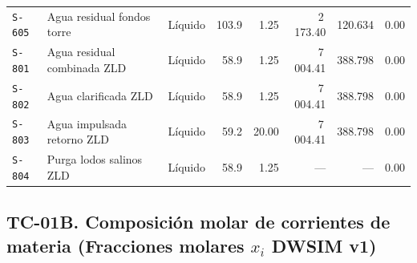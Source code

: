 \documentclass[11pt,letterpaper]{article}
\begin{document}
\begin{landscape}
\begin{center}
\begin{tabularx}{\textwidth}{lXcrrrrc}
\texttt{S-605} & Agua residual fondos torre & Líquido & 103.9 & 1.25 & 2\,173.40 & 120.634 & 0.00 \\
\texttt{S-801} & Agua residual combinada ZLD & Líquido & 58.9 & 1.25 & 7\,004.41 & 388.798 & 0.00 \\
\texttt{S-802} & Agua clarificada ZLD & Líquido & 58.9 & 1.25 & 7\,004.41 & 388.798 & 0.00 \\
\texttt{S-803} & Agua impulsada retorno ZLD & Líquido & 59.2 & 20.00 & 7\,004.41 & 388.798 & 0.00 \\
\texttt{S-804} & Purga lodos salinos ZLD & Líquido & 58.9 & 1.25 & --- & --- & 0.00 \\
\bottomrule
\end{tabularx}
\end{center}

\clearpage

\subsection{TC-01B. Composición molar de corrientes de materia (Fracciones molares $x_i$ DWSIM v1)}


\end{landscape}
\end{document}
